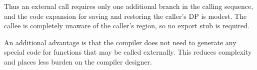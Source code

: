 Thus an external call requires only one additional branch in the calling sequence, and the code expansion for saving and restoring the caller’s DP is modest. The callee is completely unaware of the caller’s region, so no export stub is required.

An additional advantage is that the compiler does not need to generate any special code for functions that may be called externally. This reduces complexity and places less burden on the compiler designer.
